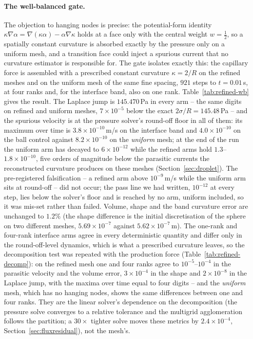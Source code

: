 \documentclass[preprint,3p,11pt]{elsarticle}
\begin{document}
\paragraph{The well-balanced gate.}
The objection to hanging nodes is precise: the potential-form identity
$\kappa\nabla\alpha=\nabla(\kappa\alpha)-\alpha\nabla\kappa$ holds at a face only with the
central weight $w=\tfrac12$, so a spatially constant curvature is absorbed exactly by the
pressure only on a uniform mesh, and a transition face could inject a spurious current
that no curvature estimator is responsible for. The gate isolates exactly this: the
capillary force is assembled with a prescribed constant curvature $\kappa=2/R$ on the
refined meshes and on the uniform mesh of the same fine spacing, $921$ steps to
$t=0.01$\,s, at four ranks and, for the interface band, also on one rank.
Table~\ref{tab:refined-wb} gives the result. The Laplace jump is $145.470$\,Pa in every
arm -- the same digits on refined and uniform meshes, $7\times10^{-5}$ below the exact
$2\sigma/R=145.48$\,Pa -- and the spurious velocity is at the pressure solver's round-off
floor in all of them: its maximum over time is $3.8\times10^{-10}$\,m/s on the interface
band and $4.0\times10^{-10}$ on the ball control against $8.2\times10^{-10}$ on the
\emph{uniform} mesh; at the end of the run the uniform arm has decayed to
$6\times10^{-12}$ while the refined arms hold $1.3$--$1.8\times10^{-10}$, five orders of
magnitude below the parasitic currents the reconstructed curvature produces on these
meshes (Section~\ref{sec:droplet}). The pre-registered falsification -- a refined arm
above $10^{-9}$\,m/s while the uniform arm sits at round-off -- did not occur; the
pass line we had written, $10^{-12}$ at every step, lies below the solver's floor and is
reached by no arm, uniform included, so it was mis-set rather than failed. Volume,
shape and the band curvature error are unchanged to $1.2\%$ (the shape difference is
the initial discretisation of the sphere on two different meshes, $5.69\times10^{-7}$
against $5.62\times10^{-7}$\,m). The one-rank and four-rank interface arms agree in
every deterministic quantity and differ only in the round-off-level dynamics, which is
what a prescribed curvature leaves, so the decomposition test was repeated with the
production force (Table~\ref{tab:refined-decomp}): on the refined mesh one and four
ranks agree to $10^{-5}$--$10^{-4}$ in the parasitic velocity and the volume error,
$3\times10^{-4}$ in the shape and $2\times10^{-8}$ in the Laplace jump, with the maxima
over time equal to four digits -- and the \emph{uniform} mesh, which has no hanging nodes,
shows the same differences between one and four ranks. They are the linear solver's
dependence on the decomposition (the pressure solve converges to a relative tolerance and
the multigrid agglomeration follows the partition; a $30\times$ tighter solve moves these
metrics by $2.4\times10^{-4}$, Section~\ref{sec:fluxresidual}), not the mesh's.
\end{document}
